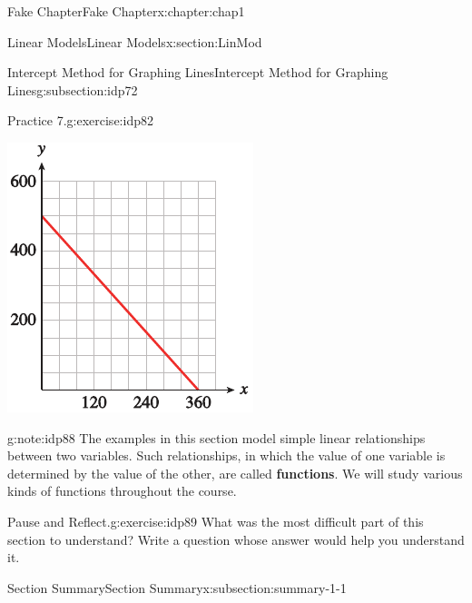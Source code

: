 \documentclass[oneside,10pt,]{book}
\newcommand{\terminology}[1]{\textbf{#1}}
\numberwithin{equation}{section}
\begin{document}
\begin{chapterptx}{Fake Chapter}{}{Fake Chapter}{}{}{x:chapter:chap1}
\begin{sectionptx}{Linear Models}{}{Linear Models}{}{}{x:section:LinMod}
\begin{subsectionptx}{Intercept Method for Graphing Lines}{}{Intercept Method for Graphing Lines}{}{}{g:subsection:idp72}
\begin{inlineexercise}{Practice 7.}{g:exercise:idp82}
\begin{sidebyside}{1}{0.375}{0.375}{0}
\begin{sbspanel}{0.25}
\includegraphics[width=\linewidth]{external/photos/fig-in-ex-ans-1-1-7.pdf}
\end{sbspanel}%
\end{sidebyside}%
\par
\end{inlineexercise}%
\begin{note}{}{g:note:idp88}%
The examples in this section model simple linear relationships between two variables. Such relationships, in which the value of one variable is determined by the value of the other, are called \terminology{functions}. We will study various kinds of functions throughout the course.%
\end{note}
\begin{inlineexercise}{Pause and Reflect.}{g:exercise:idp89}%
What was the most difficult part of this section to understand? Write a question whose answer would help you understand it.%
\end{inlineexercise}%
\end{subsectionptx}
%
%
\typeout{************************************************}
\typeout{************************************************}
%
\begin{subsectionptx}{Section Summary}{}{Section Summary}{}{}{x:subsection:summary-1-1}

\end{subsectionptx}
\end{sectionptx}
\end{chapterptx}
\end{document}
